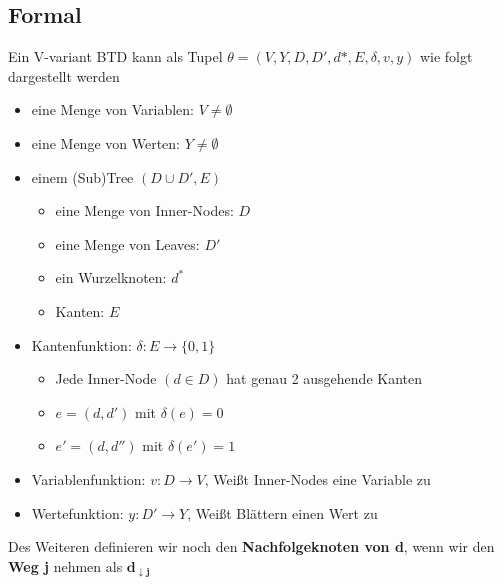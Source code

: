 \documentclass[12pt,a4paper]{article}
\begin{document}
\subsection{Formal}
Ein V-variant BTD kann als Tupel $\theta = (V,Y,D,D',d*,E,\delta,v,y)$ wie folgt dargestellt werden
\begin{itemize}
\item eine Menge von Variablen: $V \neq \emptyset$
\item eine Menge von Werten: $Y \neq \emptyset$
\item einem (Sub)Tree $(D\cup D', E)$
\begin{itemize}
\item eine Menge von Inner-Nodes: $D$
\item eine Menge von Leaves: $D'$
\item ein Wurzelknoten: $d^*$
\item Kanten: $E$
\end{itemize}
\item Kantenfunktion: $\delta: E \rightarrow \{0,1\}$
\begin{itemize}
\item Jede Inner-Node $(d\in D)$ hat genau 2 ausgehende Kanten
\item $e=(d,d')$ mit $\delta(e) = 0$
\item $e'=(d,d'')$ mit $\delta(e') = 1$
\end{itemize}
\item Variablenfunktion: $v:D\rightarrow V$, Weißt Inner-Nodes eine Variable zu 
\item Wertefunktion: $y:D'\rightarrow Y$, Weißt Blättern einen Wert zu
\end{itemize}
Des Weiteren definieren wir noch den \textbf{Nachfolgeknoten von d}, wenn wir den \textbf{Weg j} nehmen als $\mathbf{d_{\downarrow j}}$

\begin{figure}[H]
\end{figure}
\end{document}
